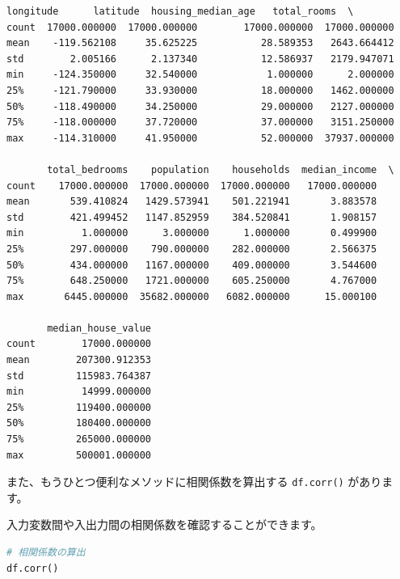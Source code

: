 \begin{lstlisting}[style=outputcell]
          longitude      latitude  housing_median_age   total_rooms  \
count  17000.000000  17000.000000        17000.000000  17000.000000   
mean    -119.562108     35.625225           28.589353   2643.664412   
std        2.005166      2.137340           12.586937   2179.947071   
min     -124.350000     32.540000            1.000000      2.000000   
25%     -121.790000     33.930000           18.000000   1462.000000   
50%     -118.490000     34.250000           29.000000   2127.000000   
75%     -118.000000     37.720000           37.000000   3151.250000   
max     -114.310000     41.950000           52.000000  37937.000000   

       total_bedrooms    population    households  median_income  \
count    17000.000000  17000.000000  17000.000000   17000.000000   
mean       539.410824   1429.573941    501.221941       3.883578   
std        421.499452   1147.852959    384.520841       1.908157   
min          1.000000      3.000000      1.000000       0.499900   
25%        297.000000    790.000000    282.000000       2.566375   
50%        434.000000   1167.000000    409.000000       3.544600   
75%        648.250000   1721.000000    605.250000       4.767000   
max       6445.000000  35682.000000   6082.000000      15.000100   

       median_house_value  
count        17000.000000  
mean        207300.912353  
std         115983.764387  
min          14999.000000  
25%         119400.000000  
50%         180400.000000  
75%         265000.000000  
max         500001.000000  
\end{lstlisting}

また、もうひとつ便利なメソッドに相関係数を算出する \texttt{df.corr()} があります。

入力変数間や入出力間の相関係数を確認することができます。


\begin{lstlisting}[style=codecell,language=Python]
# 相関係数の算出
df.corr()
\end{lstlisting}

